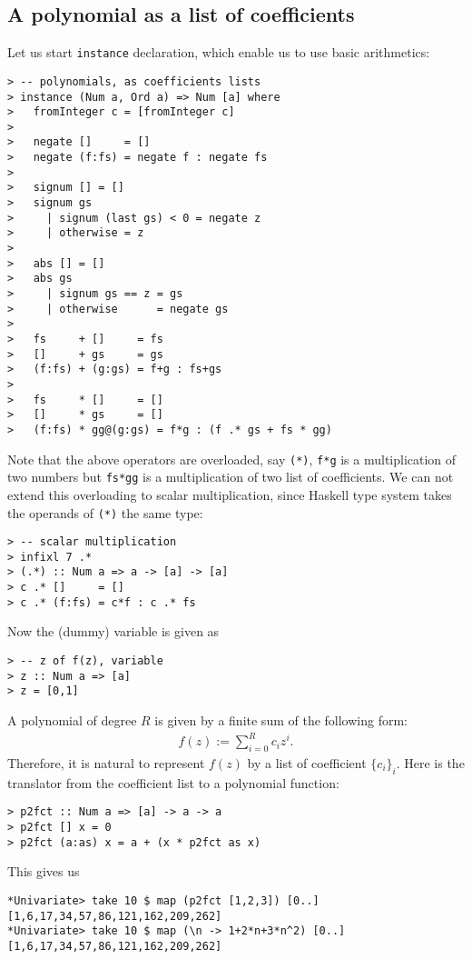 \documentclass[11pt]{book}
\begin{document}
\subsection{A polynomial as a list of coefficients}
Let us start \texttt{instance} declaration, which enable us to use basic arithmetics:
\begin{verbatim}
> -- polynomials, as coefficients lists
> instance (Num a, Ord a) => Num [a] where
>   fromInteger c = [fromInteger c] 
> 
>   negate []     = []
>   negate (f:fs) = negate f : negate fs
> 
>   signum [] = []
>   signum gs 
>     | signum (last gs) < 0 = negate z
>     | otherwise = z
> 
>   abs [] = []
>   abs gs 
>     | signum gs == z = gs
>     | otherwise      = negate gs
> 
>   fs     + []     = fs
>   []     + gs     = gs
>   (f:fs) + (g:gs) = f+g : fs+gs
> 
>   fs     * []     = []
>   []     * gs     = []
>   (f:fs) * gg@(g:gs) = f*g : (f .* gs + fs * gg)
\end{verbatim}
Note that the above operators are overloaded, say \texttt{(*)}, \texttt{f*g} is a multiplication of two numbers but \texttt{fs*gg} is a multiplication of two list of coefficients.
We can not extend this overloading to scalar multiplication, since Haskell type system takes the operands of \texttt{(*)} the same type:
\begin{verbatim}
> -- scalar multiplication
> infixl 7 .*
> (.*) :: Num a => a -> [a] -> [a]
> c .* []     = []
> c .* (f:fs) = c*f : c .* fs
\end{verbatim}
Now the (dummy) variable is given as 
\begin{verbatim}
> -- z of f(z), variable
> z :: Num a => [a]
> z = [0,1]
\end{verbatim}

A polynomial of degree $R$ is given by a finite sum of the following form:
\begin{eqnarray}
f(z) := \sum_{i=0}^R c_i z^i.
\end{eqnarray}
Therefore, it is natural to represent $f(z)$ by a list of coefficient $\{c_i\}_i$.
Here is the translator from the coefficient list to a polynomial function:
\begin{verbatim}
> p2fct :: Num a => [a] -> a -> a
> p2fct [] x = 0
> p2fct (a:as) x = a + (x * p2fct as x)
\end{verbatim}
This gives us
\begin{verbatim}
*Univariate> take 10 $ map (p2fct [1,2,3]) [0..]
[1,6,17,34,57,86,121,162,209,262]
*Univariate> take 10 $ map (\n -> 1+2*n+3*n^2) [0..]
[1,6,17,34,57,86,121,162,209,262]
\end{verbatim}
\end{document}
